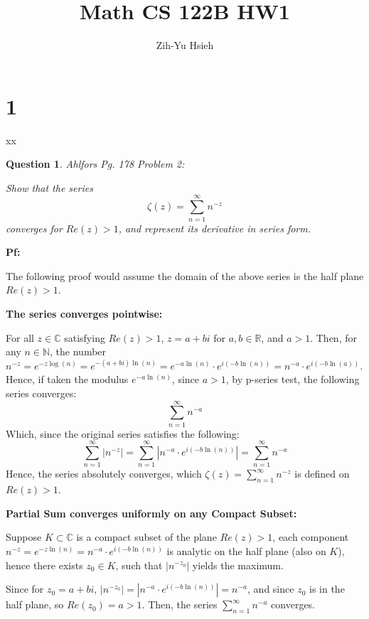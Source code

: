 \documentclass{article}
\title{Math CS 122B HW1}
\author{Zih-Yu Hsieh}
\newtheorem{question}{Question}
\begin{document}
\maketitle

\section*{1}xx
\begin{myBox}[]{}
    \begin{question}
        Ahlfors Pg. 178 Problem 2:

        Show that the series
        $$\zeta(z)=\sum_{n=1}^{\infty}n^{-z}$$
        converges for $Re(z)>1$, and represent its derivative in series form.
    \end{question}
\end{myBox}

\textbf{Pf:}

The following proof would assume the domain of the above series is the half plane $Re(z)>1$.

\hfil

\textbf{The series converges pointwise:}

For all $z\in\mathbb{C}$ satisfying $Re(z)>1$, $z=a+bi$ for $a,b\in\mathbb{R}$, and $a>1$. Then, for any $n\in\mathbb{N}$,
the number $n^{-z}=e^{-z\log(n)} = e^{-(a+bi)\ln(n)} = e^{-a\ln(n)}\cdot e^{i(-b\ln(n))} = n^{-a}\cdot e^{i(-b\ln(a))}$. Hence, if taken the modulus $e^{-a\ln(n)}$,
since $a>1$, by p-series test, the following series converges:
$$\sum_{n=1}^{\infty}n^{-a}$$
Which, since the original series satisfies the following:
$$\sum_{n=1}^{\infty}|n^{-z}| = \sum_{n=1}^{\infty}\left|n^{-a}\cdot e^{i(-b\ln(n))}\right| = \sum_{n=1}^{\infty}n^{-a}$$
Hence, the series absolutely converges, which $\zeta(z)=\sum_{n=1}^{\infty}n^{-z}$ is defined on $Re(z)>1$.

\hfil

\textbf{Partial Sum converges uniformly on any Compact Subset:}

Suppose $K\subset \mathbb{C}$ is a compact subset of the plane $Re(z)>1$, each component $n^{-z}=e^{-z\ln(n)}=n^{-a}\cdot e^{i(-b\ln(n))}$ is analytic on the half plane (also on $K$), 
hence there exists $z_0\in K$, such that $|n^{-z_0}|$ yields the maximum.

Since for $z_0=a+bi$, $|n^{-z_0}|=\left|n^{-a}\cdot e^{i(-b\ln(n))}\right|=n^{-a}$, and since $z_0$ is in the half plane, so $Re(z_0)=a>1$. Then, the series $\sum_{n=1}^{\infty}n^{-a}$ converges.
\end{document}
